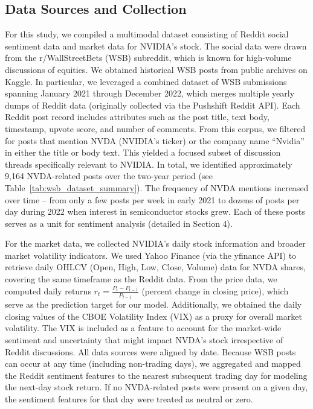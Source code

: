 \documentclass[conference]{IEEEtran}
\begin{document}
\subsection{Data Sources and Collection}
For this study, we compiled a multimodal dataset consisting of Reddit social sentiment data and market data for NVIDIA’s stock. The social data were drawn from the r/WallStreetBets (WSB) subreddit, which is known for high-volume discussions of equities. We obtained historical WSB posts from public archives on Kaggle. In particular, we leveraged a combined dataset of WSB submissions spanning January 2021 through December 2022, which merges multiple yearly dumps of Reddit data (originally collected via the Pushshift Reddit API). Each Reddit post record includes attributes such as the post title, text body, timestamp, upvote score, and number of comments. From this corpus, we filtered for posts that mention NVDA (NVIDIA’s ticker) or the company name “Nvidia” in either the title or body text. This yielded a focused subset of discussion threads specifically relevant to NVIDIA. In total, we identified approximately 9,164 NVDA-related posts over the two-year period (see Table~\ref{tab:wsb_dataset_summary}). The frequency of NVDA mentions increased over time – from only a few posts per week in early 2021 to dozens of posts per day during 2022 when interest in semiconductor stocks grew. Each of these posts serves as a unit for sentiment analysis (detailed in Section 4).

For the market data, we collected NVIDIA’s daily stock information and broader market volatility indicators. We used Yahoo Finance (via the yfinance API) to retrieve daily OHLCV (Open, High, Low, Close, Volume) data for NVDA shares, covering the same timeframe as the Reddit data. From the price data, we computed daily returns $r_t = \frac{P_t - P_{t-1}}{P_{t-1}}$ (percent change in closing price), which serve as the prediction target for our model. Additionally, we obtained the daily closing values of the CBOE Volatility Index (VIX) as a proxy for overall market volatility. The VIX is included as a feature to account for the market-wide sentiment and uncertainty that might impact NVDA’s stock irrespective of Reddit discussions. All data sources were aligned by date. Because WSB posts can occur at any time (including non-trading days), we aggregated and mapped the Reddit sentiment features to the nearest subsequent trading day for modeling the next-day stock return. If no NVDA-related posts were present on a given day, the sentiment features for that day were treated as neutral or zero.
\end{document}

